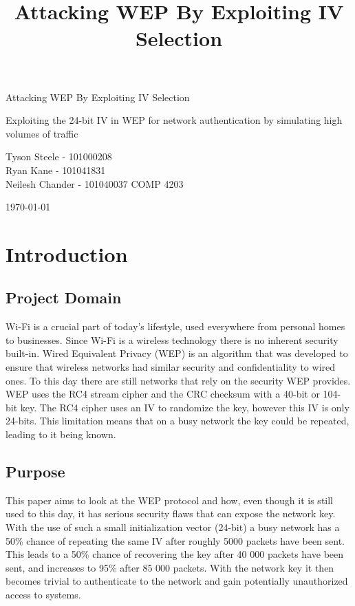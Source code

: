 \documentclass[10pt, titlepage]{article}
\begin{document}
\title{Attacking WEP By Exploiting IV Selection}


\begin{titlepage}
	\centering
	\vspace{3cm} \par
	\huge Attacking WEP By Exploiting IV Selection \par
	\large Exploiting the 24-bit IV in WEP for network authentication by simulating high volumes of traffic\par
	\vspace{8cm} \par
	Tyson Steele - 101000208\\
	Ryan Kane - 101041831\\
	Neilesh Chander - 101040037
	\vfill
	\large COMP 4203 \par
	\large \today\par
\end{titlepage}
\newpage

\tableofcontents
\newpage

\listoffigures
\newpage

\listoftables
\newpage

\section{Introduction}

\subsection{Project Domain}
Wi-Fi is a crucial part of today’s lifestyle, used everywhere from personal homes to businesses. Since Wi-Fi is a wireless technology there is no inherent security built-in. Wired Equivalent Privacy (WEP) is an algorithm that was developed to ensure that wireless networks had similar security and confidentiality to wired ones. To this day there are still networks that rely on the security WEP provides. WEP uses the RC4 stream cipher and the CRC checksum with a 40-bit or 104-bit key. The RC4 cipher uses an IV to randomize the key, however this IV is only 24-bits. This limitation means that on a busy network the key could be repeated, leading to it being known.

\subsection{Purpose}
This paper aims to look at the WEP protocol and how, even though it is still used to this day, it has serious security flaws that can expose the network key. With the use of such a small initialization vector (24-bit) a busy network has a 50\% chance of repeating the same IV after roughly 5000 packets have been sent. This leads to a 50\% chance of recovering the key after 40 000 packets have been sent, and increases to 95\% after 85 000 packets. With the network key it then becomes trivial to authenticate to the network and gain potentially unauthorized access to systems.
\end{document}
